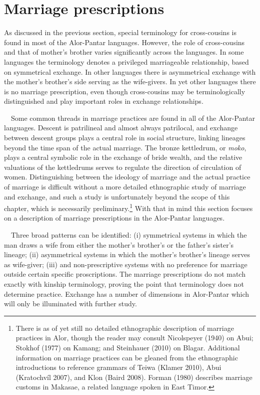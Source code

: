 \section[Marriage prescriptions]{Marriage prescriptions}
\hypertarget{RefHeading78035871885726}{}As discussed in the previous section, special terminology for cross-cousins is found in most of the Alor-Pantar languages. However, the role of cross-cousins and that of mother{\textquoteright}s brother varies significantly across the languages. In some languages the terminology denotes a privileged marriageable relationship, based on symmetrical exchange. In other languages there is asymmetrical exchange with the mother{\textquoteright}s brother{\textquoteright}s side serving as the wife-givers. In yet other languages there is no marriage prescription, even though cross-cousins may be terminologically distinguished and  play important roles in exchange relationships. 

\ \ Some common threads in marriage practices are found in all of the Alor-Pantar languages. Descent is patrilineal and almost always patrilocal, and exchange between descent groups plays a central role in social structure, linking lineages beyond the time span of the actual marriage. The bronze kettledrum, or \textit{moko}, plays a central symbolic role in the exchange of bride wealth, and the relative valuations of the kettledrums serves to regulate the direction of circulation of women. Distinguishing between the ideology of marriage and the actual practice of marriage is difficult without a more detailed ethnographic study of marriage and exchange, and such a study is unfortunately beyond the scope of this chapter, which is necessarily preliminary.\footnote{ There is as of yet still no detailed ethnographic description of marriage practices in Alor, though the reader may consult Nicolspeyer (1940) on Abui; Stokhof (1977) on Kamang; and Steinhauer (2010) on Blagar. Additional information on marriage 
practices can be gleaned from the ethnographic introductions to reference grammars of Teiwa (Klamer 2010), Abui (Kratochv\'il 2007), and Klon (Baird 2008). Forman (1980) describes marriage customs in Makasae, a related language spoken in East Timor.} With that in mind this section focuses on a description of marriage prescriptions in the Alor-Pantar languages. 

\ \ Three broad patterns can be identified: (i) symmetrical systems in which the man draws a wife from either the mother{\textquoteright}s brother{\textquoteright}s or the father{\textquoteright}s sister{\textquoteright}s lineage; (ii) asymmetrical systems in which the mother{\textquoteright}s brother{\textquoteright}s lineage serves as wife-giver; (iii) and non-prescriptive systems with no preference for marriage outside certain specific proscriptions. The marriage prescriptions do not match exactly with kinship terminology, proving the point that  terminology does not determine practice. Exchange has a number of dimensions in Alor-Pantar which will only be illuminated with further study.


